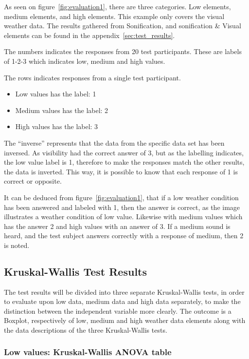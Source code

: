 As seen on figure~\ref{fig:evaluation1}, there are three categories. 
Low elements, medium elements, and high elements. 
This example only covers the visual weather data. 
The results gathered from Sonification, and sonification \& Visual elements can be found in the appendix~\ref{sec:test_results}.

The numbers indicates the responses from 20 test participants. 
These are labels of 1-2-3 which indicates low, medium and high values.

The rows indicates responses from a single test participant.

\begin{itemize}
    \item Low values has the label: 1
    \item Medium values has the label: 2
    \item High values has the label: 3
\end{itemize}

The \enquote{inverse} represents that the data from the specific data set has been inversed. 
As visibility had the correct answer of 3, but as the labelling indicates, the low value label is 1, therefore to make the responses match the other results, the data is inverted. 
This way, it is possible to know that each response of 1 is correct or opposite.


It can be deduced from figure~\ref{fig:evaluation1}, that if a low weather condition has been answered and labeled with 1, then the answer is correct, as the image illustrates a weather condition of low value. 
Likewise with medium values which has the answer 2 and high values with an answer of 3. 
If a medium sound is heard, and the test subject answers correctly with a response of medium, then 2 is noted.

\subsection{Kruskal-Wallis Test Results} %
\label{sub:kruskal_wallis_test_results}

The test results will be divided into three separate Kruskal-Wallis tests, in order to evaluate upon low data, medium data and high data separately, to make the distinction between the independent variable more clearly. 
The outcome is a Boxplot, respectively of low, medium and high weather data elements along with the data descriptions of the three Kruskal-Wallis tests.


\subsubsection*{Low values: Kruskal-Wallis ANOVA table} %
\label{ssub:low_values_kruskal_wallis_anova_table}

